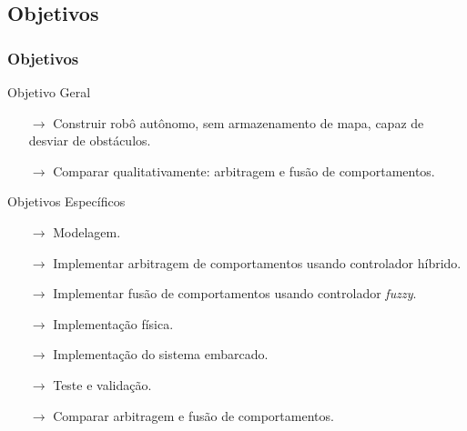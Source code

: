 \subsection{Objetivos}
\begin{frame}
	\frametitle{Objetivos}
	\begin{exampleblock}{Objetivo Geral}
		\begin{itemize}
		  \item[$\rightarrow$] Construir robô autônomo, sem armazenamento de mapa,
		  capaz de desviar de obstáculos.
		  \pause
		  \item[$\rightarrow$] Comparar qualitativamente: arbitragem e fusão de comportamentos.
		\end{itemize}
	\end{exampleblock}
	\pause
	\begin{block}{Objetivos Específicos}
		\begin{itemize}
		  \item[$\rightarrow$] Modelagem.
		  \pause
		  \item[$\rightarrow$] Implementar arbitragem de comportamentos usando controlador 
		  híbrido.
		  \pause
		  \item[$\rightarrow$] Implementar fusão de comportamentos usando controlador 
		  \textit{fuzzy}.
		  \pause
		  \item[$\rightarrow$] Implementação física.
		  \pause
		  \item[$\rightarrow$] Implementação do sistema embarcado.
		  \pause
		  \item[$\rightarrow$] Teste e validação.
		  \pause
		  \item[$\rightarrow$] Comparar arbitragem e fusão de comportamentos.
		\end{itemize}
	\end{block}
\end{frame}